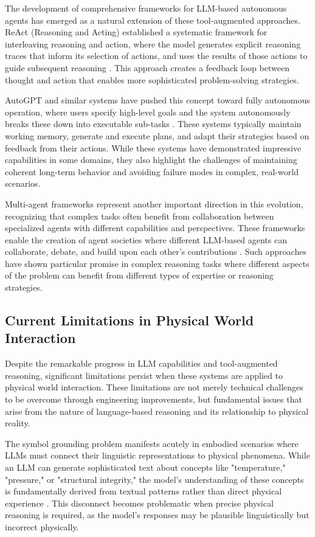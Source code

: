 The development of comprehensive frameworks for LLM-based autonomous agents has emerged as a natural extension of these tool-augmented approaches. ReAct (Reasoning and Acting) established a systematic framework for interleaving reasoning and action, where the model generates explicit reasoning traces that inform its selection of actions, and uses the results of those actions to guide subsequent reasoning \cite{yao2022react}. This approach creates a feedback loop between thought and action that enables more sophisticated problem-solving strategies.

AutoGPT and similar systems have pushed this concept toward fully autonomous operation, where users specify high-level goals and the system autonomously breaks these down into executable sub-tasks \cite{richards2023autogpt}. These systems typically maintain working memory, generate and execute plans, and adapt their strategies based on feedback from their actions. While these systems have demonstrated impressive capabilities in some domains, they also highlight the challenges of maintaining coherent long-term behavior and avoiding failure modes in complex, real-world scenarios.

Multi-agent frameworks represent another important direction in this evolution, recognizing that complex tasks often benefit from collaboration between specialized agents with different capabilities and perspectives. These frameworks enable the creation of agent societies where different LLM-based agents can collaborate, debate, and build upon each other's contributions \cite{li2023camel}. Such approaches have shown particular promise in complex reasoning tasks where different aspects of the problem can benefit from different types of expertise or reasoning strategies.

\subsection{Current Limitations in Physical World Interaction}

Despite the remarkable progress in LLM capabilities and tool-augmented reasoning, significant limitations persist when these systems are applied to physical world interaction. These limitations are not merely technical challenges to be overcome through engineering improvements, but fundamental issues that arise from the nature of language-based reasoning and its relationship to physical reality.

The symbol grounding problem manifests acutely in embodied scenarios where LLMs must connect their linguistic representations to physical phenomena. While an LLM can generate sophisticated text about concepts like "temperature," "pressure," or "structural integrity," the model's understanding of these concepts is fundamentally derived from textual patterns rather than direct physical experience \cite{harnad1990symbol}. This disconnect becomes problematic when precise physical reasoning is required, as the model's responses may be plausible linguistically but incorrect physically.

